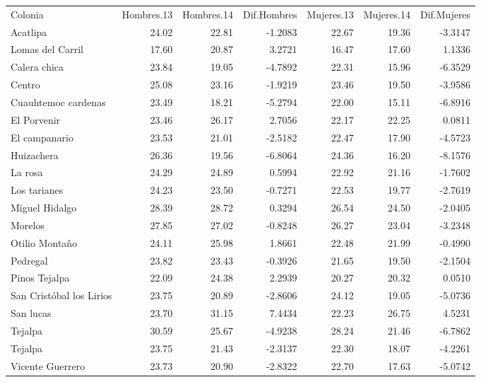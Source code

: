\documentclass[]{article}
\begin{document}
\begin{longtable}[c]{@{}lrrrrrr@{}}
\toprule\addlinespace
Colonia & Hombres.13 & Hombres.14 & Dif.Hombres & Mujeres.13 &
Mujeres.14 & Dif.Mujeres
\\\addlinespace
\midrule\endhead
Acatlipa & 24.02 & 22.81 & -1.2083 & 22.67 & 19.36 & -3.3147
\\\addlinespace
Lomas del Carril & 17.60 & 20.87 & 3.2721 & 16.47 & 17.60 & 1.1336
\\\addlinespace
Calera chica & 23.84 & 19.05 & -4.7892 & 22.31 & 15.96 & -6.3529
\\\addlinespace
Centro & 25.08 & 23.16 & -1.9219 & 23.46 & 19.50 & -3.9586
\\\addlinespace
Cuauhtemoc cardenas & 23.49 & 18.21 & -5.2794 & 22.00 & 15.11 & -6.8916
\\\addlinespace
El Porvenir & 23.46 & 26.17 & 2.7056 & 22.17 & 22.25 & 0.0811
\\\addlinespace
El campanario & 23.53 & 21.01 & -2.5182 & 22.47 & 17.90 & -4.5723
\\\addlinespace
Huizachera & 26.36 & 19.56 & -6.8064 & 24.36 & 16.20 & -8.1576
\\\addlinespace
La rosa & 24.29 & 24.89 & 0.5994 & 22.92 & 21.16 & -1.7602
\\\addlinespace
Los tarianes & 24.23 & 23.50 & -0.7271 & 22.53 & 19.77 & -2.7619
\\\addlinespace
Miguel Hidalgo & 28.39 & 28.72 & 0.3294 & 26.54 & 24.50 & -2.0405
\\\addlinespace
Morelos & 27.85 & 27.02 & -0.8248 & 26.27 & 23.04 & -3.2348
\\\addlinespace
Otilio Montaño & 24.11 & 25.98 & 1.8661 & 22.48 & 21.99 & -0.4990
\\\addlinespace
Pedregal & 23.82 & 23.43 & -0.3926 & 21.65 & 19.50 & -2.1504
\\\addlinespace
Pinos Tejalpa & 22.09 & 24.38 & 2.2939 & 20.27 & 20.32 & 0.0510
\\\addlinespace
San Cristóbal los Lirios & 23.75 & 20.89 & -2.8606 & 24.12 & 19.05 &
-5.0736
\\\addlinespace
San lucas & 23.70 & 31.15 & 7.4434 & 22.23 & 26.75 & 4.5231
\\\addlinespace
Tejalpa & 30.59 & 25.67 & -4.9238 & 28.24 & 21.46 & -6.7862
\\\addlinespace
Tejalpa & 23.75 & 21.43 & -2.3137 & 22.30 & 18.07 & -4.2261
\\\addlinespace
Vicente Guerrero & 23.73 & 20.90 & -2.8322 & 22.70 & 17.63 & -5.0742

\end{longtable}
\end{document}
